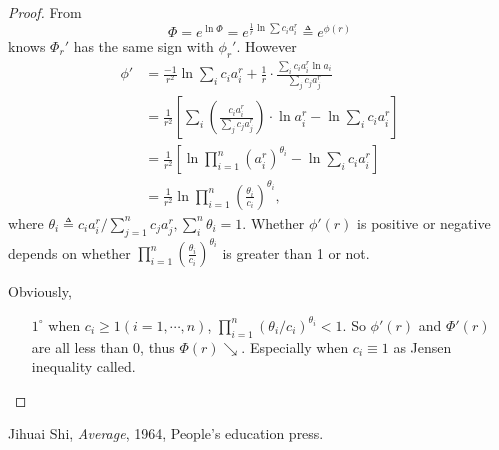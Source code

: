 \documentclass[12pt,a4paper,reqno]{amsart}
\theoremstyle{plain}
\theoremstyle{definition}
\begin{document}
\begin{proof}
  From $$\Phi=e^{\ln\Phi}=e^{\frac{1}{r}\ln\sum c_i a_i^r} \triangleq e^{\phi(r)}$$ knows $\Phi_r'$ has the same sign with $\phi_r'$. However
\begin{equation*}
\begin{split}
  \phi' & = \frac{-1}{r^2}\ln\sum_i c_i a_i^r + \frac{1}{r}\cdot\frac{\sum_i c_i a_i^r\ln a_i}{\sum_j c_j a_j^r} \\
        & = \frac{1}{r^2} \left[\sum_i  \left(\frac{c_i a_i^r}{\sum_j c_j a_j^r}\right)\cdot \ln a_i^r-\ln\sum_i c_i a_i^r \right] \\ 
        & = \frac{1}{r^2} \left[\ln \prod_{i=1}^n \left(a_i^r\right)^{\theta_i} - \ln\sum_i c_i a_i^r \right] \\
        & = \frac{1}{r^2} \ln\prod_{i=1}^n \left(\frac{\theta_i}{c_i}\right)^{\theta_i}, 
\end{split}
\end{equation*}
where $\theta_i\triangleq c_i a_i^r / \sum\limits_{j=1}^n c_j a_j^r, \sum\limits_i^n \theta_i = 1$. Whether $\phi'(r)$ is positive or negative depends on whether $\prod\limits_{i=1}^n\left(\frac{\theta_i}{c_i} \right)^{\theta_i}$ is greater than 1 or not. 

Obviously, 

\begin{enumerate}

  \item [$1^{\circ}$] when $c_i\geqslant 1 (i=1,\cdots , n)$, $\prod\limits_{i=1}^n (\theta_i/c_i)^{\theta_i}<1$. So $\phi'(r)$ and $\Phi'(r)$ are all less than 0, thus $\Phi(r) \searrow$. Especially when $c_i\equiv1$ as Jensen inequality called. 

\end{enumerate}

\end{proof}

\begin{thebibliography}{99} 

 Jihuai Shi, \textit{Average}, 1964, People's education press.  


\end{thebibliography}
\end{document}
